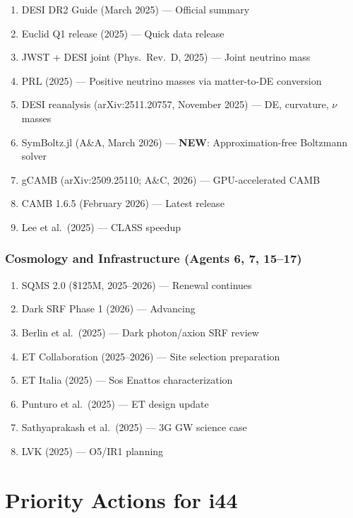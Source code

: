 \documentclass[11pt,a4paper]{article}
\newcommand{\NEW}{\textcolor{dfdblue}{\textbf{NEW}}}
\begin{document}
\begin{enumerate}
\item DESI DR2 Guide (March 2025) --- Official summary
\item Euclid Q1 release (2025) --- Quick data release
\item JWST + DESI joint (Phys.\ Rev.\ D, 2025) --- Joint neutrino mass
\item PRL (2025) --- Positive neutrino masses via matter-to-DE conversion
\item DESI reanalysis (arXiv:2511.20757, November 2025) --- DE, curvature, $\nu$ masses
\item SymBoltz.jl (A\&A, March 2026) --- \NEW: Approximation-free Boltzmann solver
\item gCAMB (arXiv:2509.25110; A\&C, 2026) --- GPU-accelerated CAMB
\item CAMB 1.6.5 (February 2026) --- Latest release
\item Lee et al.\ (2025) --- CLASS speedup
\end{enumerate}

\section{Cosmology and Infrastructure (Agents 6, 7, 15--17)}

\begin{enumerate}
\item SQMS 2.0 (\$125M, 2025--2026) --- Renewal continues
\item Dark SRF Phase 1 (2026) --- Advancing
\item Berlin et al.\ (2025) --- Dark photon/axion SRF review
\item ET Collaboration (2025--2026) --- Site selection preparation
\item ET Italia (2025) --- Sos Enattos characterization
\item Punturo et al.\ (2025) --- ET design update
\item Sathyaprakash et al.\ (2025) --- 3G GW science case
\item LVK (2025) --- O5/IR1 planning
\end{enumerate}


\part{Priority Actions for i44}
\end{document}
